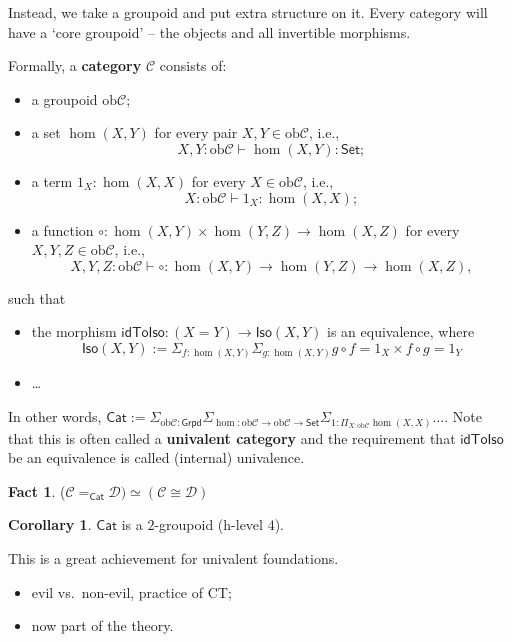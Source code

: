 \documentclass{amsart}
\theoremstyle{definition}
\newtheorem*{fact}{Fact}
\newtheorem*{cor}{Corollary}
\newcommand{\Set}{\ensuremath{\mathsf{Set}}}
\newcommand{\Cat}{\ensuremath{\mathsf{Cat}}}
\newcommand{\idToIso}{\ensuremath{\mathsf{idToIso}}}
\newcommand{\Iso}{\ensuremath{\mathsf{Iso}}}
\newcommand{\Grpd}{\ensuremath{\mathsf{Grpd}}}
\newcommand{\ob}{\ensuremath{\mathrm{ob}}}
\renewcommand{\emph}{\textbf}
\begin{document}
Instead, we take a groupoid and put extra structure on it. Every category will have a `core groupoid' -- the objects and all invertible morphisms.

Formally, a \emph{category} $\mathcal C$ consists of:
\begin{itemize}
    \item a groupoid $\ob \mathcal C$;
    \item a set $\hom(X,Y)$ for every pair $X,Y \in \ob \mathcal C$, i.e., $$X,Y : \ob \mathcal C \vdash \hom(X,Y) : \Set;$$
    \item a term $1_X: \hom(X,X)$ for every $X\in\ob \mathcal C$, i.e., $$X:\ob \mathcal C \vdash 1_X: \hom(X,X);$$
    \item a function $\circ: \hom(X,Y)\times \hom(Y,Z) \to \hom(X,Z)$ for every $X,Y,Z\in \ob\mathcal C$, i.e., $$X,Y,Z: \ob \mathcal C \vdash \circ : \hom(X,Y)\to \hom(Y,Z)\to \hom(X,Z),$$
\end{itemize}
such that 

\begin{itemize}
    \item the morphism $\idToIso: (X=Y) \to \Iso(X,Y)$ is an equivalence, where $$\Iso(X,Y) := \Sigma_{f:\hom(X,Y)} \Sigma_{g:\hom(X,Y)} g\circ f = 1_X \times f\circ g = 1_Y$$
    \item \dots
\end{itemize}

In other words, $\Cat := \Sigma_{\ob \mathcal C:\Grpd} \Sigma_{\hom: \ob\mathcal C\to\ob\mathcal C\to \Set}\Sigma_{1:\Pi_{X:\ob \mathcal C}\hom(X,X)} \dots$. Note that this is often called a \emph{univalent category} and the requirement that $\idToIso$ be an equivalence is called (internal) univalence.

\begin{fact}
($\mathcal{C} =_{\Cat} \mathcal{D}) \simeq (\mathcal{C} \cong \mathcal{D}) $ 
\end{fact}

\begin{cor}
    $\Cat$ is a $2$-groupoid (h-level $4$).
\end{cor}

This is a great achievement for univalent foundations.
\begin{itemize}
    \item evil vs.\ non-evil, practice of CT; %
    \item now part of the theory.
\end{itemize}
\end{document}
